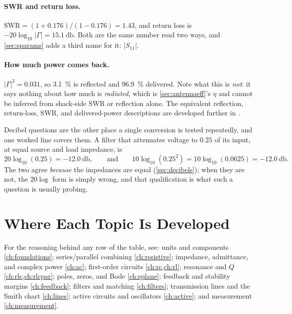 \paragraph{SWR and return loss.}
\(\mathrm{SWR}=(1+0.176)/(1-0.176)=1.43\), and return loss is
\(-20\log_{10}|\Gamma|=\SI{15.1}{\decibel}\). Both are the same number read two ways,
and \cref{sec:sparams} adds a third name for it: \(|S_{11}|\).

\paragraph{How much power comes back.}
\(|\Gamma|^2=0.031\), so \SI{3.1}{\percent} is reflected and \SI{96.9}{\percent}
delivered. Note what this is \emph{not}: it says nothing about how much is
\emph{radiated}, which is \cref{sec:antennaeff}'s \(\eta\) and cannot be inferred
from shack-side SWR or reflection alone.
The equivalent reflection, return-loss, SWR, and delivered-power descriptions are
developed further in \cite[pp.~8--14]{free2022rfmicrowave}.

\begin{exambox}
Decibel questions are the other place a single conversion is tested repeatedly, and one
worked line covers them. A filter that attenuates voltage to \(0.25\) of its input, at
equal source and load impedance, is
\[
20\log_{10}(0.25)=-\SI{12.0}{\decibel},
\qquad\text{and}\qquad
10\log_{10}(0.25^2)=10\log_{10}(0.0625)=-\SI{12.0}{\decibel}.
\]
The two agree \emph{because} the impedances are equal (\cref{sec:decibels}); when they
are not, the \(20\log\) form is simply wrong, and that qualification is what such a
question is usually probing.
\end{exambox}

\section{Where Each Topic Is Developed}
For the reasoning behind any row of the table, see: units and components
\cref{ch:foundations}; series/parallel combining \cref{ch:resistive}; impedance,
admittance, and complex power \cref{ch:ac}; first-order circuits \cref{ch:rc,ch:rl};
resonance and \(Q\) \cref{ch:rlc,ch:rlcpar}; poles, zeros, and Bode
\cref{ch:splane}; feedback and stability margins \cref{ch:feedback}; filters and
matching \cref{ch:filters}; transmission lines and the Smith chart \cref{ch:lines};
active circuits and oscillators \cref{ch:active}; and measurement
\cref{ch:measurement}.
